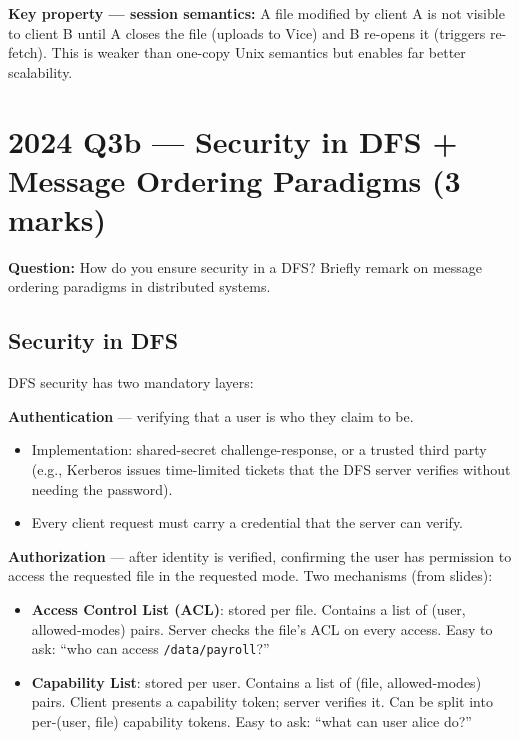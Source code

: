 \documentclass[12pt,a4paper]{article}
\begin{document}
\textbf{Key property --- session semantics:} A file modified by client A is not visible to client B until A closes the file (uploads to Vice) and B re-opens it (triggers re-fetch). This is weaker than one-copy Unix semantics but enables far better scalability.

\section{2024 Q3b --- Security in DFS + Message Ordering Paradigms (3 marks)}

\textbf{Question:} How do you ensure security in a DFS? Briefly remark on message ordering paradigms in distributed systems.

\subsection*{Security in DFS}

DFS security has two mandatory layers:

\textbf{Authentication} --- verifying that a user is who they claim to be.
\begin{itemize}[noitemsep]
  \item Implementation: shared-secret challenge-response, or a trusted third party (e.g., Kerberos issues time-limited tickets that the DFS server verifies without needing the password).
  \item Every client request must carry a credential that the server can verify.
\end{itemize}

\textbf{Authorization} --- after identity is verified, confirming the user has permission to access the requested file in the requested mode. Two mechanisms (from slides):
\begin{itemize}[noitemsep]
  \item \textbf{Access Control List (ACL)}: stored per file. Contains a list of (user, allowed-modes) pairs. Server checks the file's ACL on every access. Easy to ask: ``who can access \texttt{/data/payroll}?''
  \item \textbf{Capability List}: stored per user. Contains a list of (file, allowed-modes) pairs. Client presents a capability token; server verifies it. Can be split into per-(user, file) capability tokens. Easy to ask: ``what can user alice do?''
\end{itemize}
\end{document}
